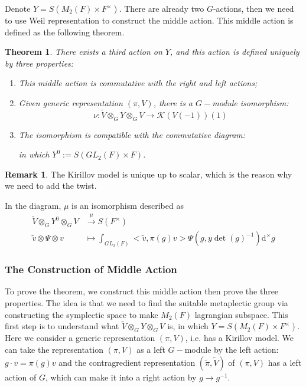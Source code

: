\documentclass[12pt,a4paper,english]{article}
\theoremstyle{plain}
\newtheorem{thm}{Theorem}[section]
\theoremstyle{definition}
\newtheorem*{rem}{Remark}
\newcommand{\mulldif}{\mathrm{d}^{\times}}
\begin{document}
Denote $Y=S(M_{2}(F)\times F^{\times})$. There are already two $G$-actions, then we need to use Weil representation to construct the middle action. This middle action is defined as the following theorem.
\begin{thm}\label{thm2.2}
There exists a third action on $Y$, and this action is defined uniquely by three properties:
\begin{enumerate}
    \item This middle action is commutative with the right and left actions;
    \item Given generic representation $(\pi, V)$, there is a $G-$module isomorphism:
    \begin{equation*}
        \nu:\widetilde{V}\otimes_{G}Y\otimes_{G}V\rightarrow\mathcal{K}(V(-1))(1)
    \end{equation*}
    \item The isomorphism is compatible with the commutative diagram:
\begin{center}
\end{center}
in which $Y^{0}:=S(GL_{2}(F)\times F)$.
\end{enumerate}
\end{thm}
\begin{rem}
The Kirillov model is unique up to scalar, which is the reason why we need to add the twist.

In the diagram, $\mu$ is an isomorphism described as  \begin{align*}
    \widetilde{V}\otimes_{G}Y^{0}\otimes_{G}V&\xrightarrow{\mu} S(F^{\times}) \\
    \widetilde{v}\otimes \Psi\otimes v&\mapsto \int_{GL_{2}(F)}<\tilde{v},\pi(g)v>\Psi(g,y\det(g)^{-1})\mulldif g
\end{align*}
\end{rem}
\subsubsection{The Construction of Middle Action}
To prove the theorem, we construct this middle action then prove the three properties. 
The idea is that we need to find the suitable metaplectic group via constructing the symplectic space to make $M_{2}(F)$ lagrangian subspace. This first step is to understand what $\widetilde{V}\otimes_{G}Y\otimes_{G}V$ is, in which $Y=S(M_{2}(F)\times F^{\times})$. Here we consider a generic representation $(\pi, V)$, i.e. has a Kirillov model. We can take the representation $(\pi, V)$ as a left $G-$module by the left action: $g\cdot v=\pi(g)v$ and the contragredient representation $(\tilde{\pi}, \widetilde{V})$ of $(\pi, V)$ has a left action of $G$, which can make it into a right action by $g\rightarrow g^{-1}$.
\end{document}
